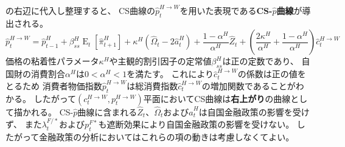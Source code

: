 の右辺に代入し整理すると、
CS曲線の\(\hat{p}_t^{H\to W}\)を用いた表現である\textbf{CS-\(\hat{p}\)曲線}が導出される。
\begin{equation}
\label{form:chapter5_two_plane_cs_derivation_p_H_W_eq}
    \hat{p}_t^{H\to W}=\hat{p}_{t-1}^H+\beta_{ss}^H\operatorname{E}_t[\hat{\pi}_{t+1}^H]+\kappa^H(\hat{\Omega}_t-2\hat{a}_t^H)+\frac{1-\alpha^H}{\alpha^H}\hat{Z}_t+\left(\frac{2\kappa^H}{\alpha^H}+\frac{1-\alpha^H}{\alpha^H}\right)\hat{c}_t^{H\to W}
\end{equation}
価格の粘着性パラメータ\(\kappa^H\)や主観的割引因子の定常値\(\beta_{ss}^H\)は正の定数であり、
自国財の消費割合\(\alpha^H\)は\(0<\alpha^H<1\)を満たす。
これにより\(\hat{c}_t^{H\to W}\)の係数は正の値をとるため
消費者物価指数\(\hat{p}_t^{H\to W}\)は総消費指数\(\hat{c}_t^{H\to W}\)の増加関数であることがわかる。
したがって\((c_t^{H\to W},p_t^{H\to W})\)平面においてCS曲線は\textbf{右上がり}の曲線として描かれる。
CS-\(\hat{p}\)曲線に含まれる\(\hat{Z}_t\)、\(\hat{\Omega}_t\)および\(\hat{a}_t^H\)は自国金融政策の影響を受けず、
また\(\lambda_t^{F/*}\)および\(p_t^{F*}\)も遮断効果により自国金融政策の影響を受けない。
したがって金融政策の分析においてはこれらの項の動きは考慮しなくてよい。

